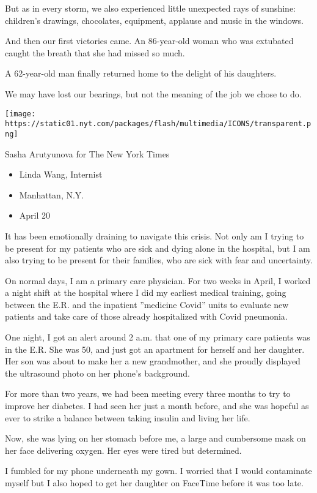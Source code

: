 But as in every storm, we also experienced little unexpected rays of
sunshine: children's drawings, chocolates, equipment, applause and music
in the windows.

And then our first victories came. An 86-year-old woman who was
extubated caught the breath that she had missed so much.

A 62-year-old man finally returned home to the delight of his daughters.

We may have lost our bearings, but not the meaning of the job we chose
to do.

\texttt{[image: https://static01.nyt.com/packages/flash/multimedia/ICONS/transparent.png]}

Sasha Arutyunova for The New York Times

\begin{itemize}
\tightlist
\item
  Linda Wang, Internist
\item
  Manhattan, N.Y.
\item
  April 20
\end{itemize}

It has been emotionally draining to navigate this crisis. Not only am I
trying to be present for my patients who are sick and dying alone in the
hospital, but I am also trying to be present for their families, who are
sick with fear and uncertainty.

On normal days, I am a primary care physician. For two weeks in April, I
worked a night shift at the hospital where I did my earliest medical
training, going between the E.R. and the inpatient ''medicine Covid''
units to evaluate new patients and take care of those already
hospitalized with Covid pneumonia.

One night, I got an alert around 2 a.m. that one of my primary care
patients was in the E.R. She was 50, and just got an apartment for
herself and her daughter. Her son was about to make her a new
grandmother, and she proudly displayed the ultrasound photo on her
phone's background.

For more than two years, we had been meeting every three months to try
to improve her diabetes. I had seen her just a month before, and she was
hopeful as ever to strike a balance between taking insulin and living
her life.

Now, she was lying on her stomach before me, a large and cumbersome mask
on her face delivering oxygen. Her eyes were tired but determined.

I fumbled for my phone underneath my gown. I worried that I would
contaminate myself but I also hoped to get her daughter on FaceTime
before it was too late.

